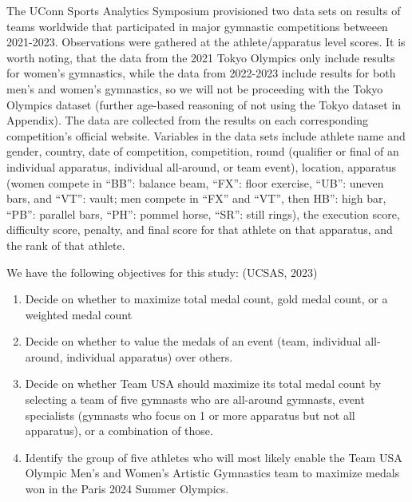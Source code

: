 \documentclass[
  10.5pt,
  letterpaper,
  DIV=11,
  numbers=noendperiod]{scrartcl}
\begin{document}
The UConn Sports Analytics Symposium provisioned two data sets on
results of teams worldwide that participated in major gymnastic
competitions betweeen 2021-2023. Observations were gathered at the
athlete/apparatus level scores. It is worth noting, that the data from
the 2021 Tokyo Olympics only include results for women's gymnastics,
while the data from 2022-2023 include results for both men's and women's
gymnastics, so we will not be proceeding with the Tokyo Olympics dataset
(further age-based reasoning of not using the Tokyo dataset in
Appendix). The data are collected from the results on each corresponding
competition's official website. Variables in the data sets include
athlete name and gender, country, date of competition, competition,
round (qualifier or final of an individual apparatus, individual
all-around, or team event), location, apparatus (women compete in
``BB'': balance beam, ``FX'': floor exercise, ``UB'': uneven bars, and
``VT'': vault; men compete in ``FX'' and ``VT'', then HB'': high bar,
``PB'': parallel bars, ``PH'': pommel horse, ``SR'': still rings), the
execution score, difficulty score, penalty, and final score for that
athlete on that apparatus, and the rank of that athlete.

We have the following objectives for this study: (UCSAS, 2023)

\begin{enumerate}
\def\labelenumi{\arabic{enumi})}
\item
  Decide on whether to maximize total medal count, gold medal count, or
  a weighted medal count
\item
  Decide on whether to value the medals of an event (team, individual
  all-around, individual apparatus) over others.
\item
  Decide on whether Team USA should maximize its total medal count by
  selecting a team of five gymnasts who are all-around gymnasts, event
  specialists (gymnasts who focus on 1 or more apparatus but not all
  apparatus), or a combination of those.
\item
  Identify the group of five athletes who will most likely enable the
  Team USA Olympic Men's and Women's Artistic Gymnastics team to
  maximize medals won in the Paris 2024 Summer Olympics.
\end{enumerate}
\end{document}
